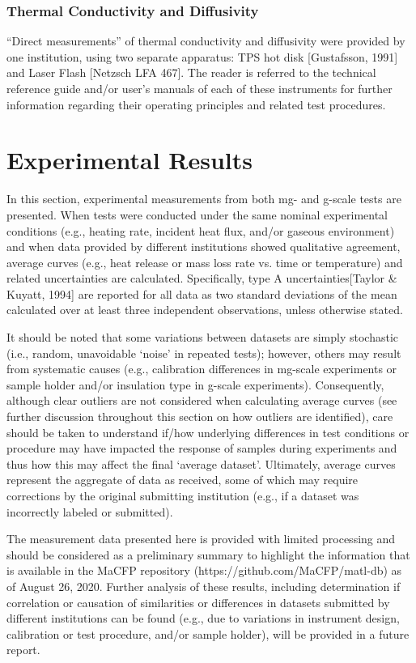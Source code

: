 \documentclass{book}
\begin{document}
\subsection{Thermal Conductivity and Diffusivity}

``Direct measurements'' of thermal conductivity and diffusivity were provided by one institution, using two separate apparatus: TPS hot disk [Gustafsson, 1991] and Laser Flash [Netzsch LFA 467]. The reader is referred to the technical reference guide and/or user’s manuals of each of these instruments for further information regarding their operating principles and related test procedures.



\chapter{Experimental Results}

In this section, experimental measurements from both mg- and g-scale tests are presented. When tests were conducted under the same nominal experimental conditions (e.g., heating rate, incident heat flux, and/or gaseous environment) and when data provided by different institutions showed qualitative agreement, average curves (e.g., heat release or mass loss rate vs. time or temperature) and related uncertainties are calculated. Specifically, type A uncertainties[Taylor \& Kuyatt, 1994] are reported for all data as two standard deviations of the mean calculated over at least three independent observations, unless otherwise stated.

It should be noted that some variations between datasets are simply stochastic (i.e., random, unavoidable ‘noise’ in repeated tests); however, others may result from systematic causes (e.g., calibration differences in mg-scale experiments or sample holder and/or insulation type in g-scale experiments). Consequently, although clear outliers are not considered when calculating average curves (see further discussion throughout this section on how outliers are identified), care should be taken to understand if/how underlying differences in test conditions or procedure may have impacted the response of samples during experiments and thus how this may affect the final ‘average dataset’. Ultimately, average curves represent the aggregate of data as received, some of which may require corrections by the original submitting institution (e.g., if a dataset was incorrectly labeled or submitted).

The measurement data presented here is provided with limited processing and should be considered as a preliminary summary to highlight the information that is available in the MaCFP repository (https://github.com/MaCFP/matl-db) as of August 26, 2020. Further analysis of these results, including determination if correlation or causation of similarities or differences in datasets submitted by different institutions can be found (e.g., due to variations in instrument design, calibration or test procedure, and/or sample holder), will be provided in a future report.
\end{document}
